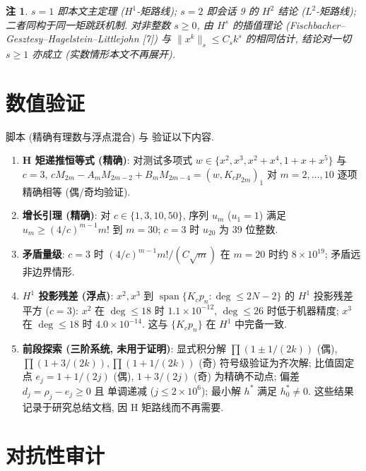 \documentclass[UTF8]{ctexart}
\newtheorem{remark}[theorem]{注}
\begin{document}
\begin{remark}
$s = 1$ 即本文主定理 ($H^1$-矩路线); $s = 2$ 即会话 9 的 $H^2$ 结论
($L^2$-矩路线); 二者同构于同一矩跳跃机制. 对非整数 $s \geq 0$, 由
$H^s$ 的插值理论 (Fischbacher--Gesztesy--Hagelstein--Littlejohn [7]) 与
$\|x^k\|_s \leq C_s k^s$ 的相同估计, 结论对一切 $s \geq 1$ 亦成立
(实数情形本文不再展开).
\end{remark}

\section{数值验证}

脚本  (精确有理数与浮点混合) 与
 验证以下内容.

\begin{enumerate}
	\item \textbf{H 矩递推恒等式 (精确)}: 对测试多项式 $w \in \{x^2, x^3,
		x^2+x^4, 1+x+x^5\}$ 与 $c = 3$,
		$c M_{2m} - A_m M_{2m-2} + B_m M_{2m-4} = (w, K_c p_{2m})_1$ 对
		$m = 2, \dots, 10$ 逐项精确相等 (偶/奇均验证).
	\item \textbf{增长引理 (精确)}: 对 $c \in \{1,3,10,50\}$, 序列
		$u_m$ ($u_1 = 1$) 满足 $u_m \geq (4/c)^{m-1} m!$ 到 $m = 30$;
		$c=3$ 时 $u_{20}$ 为 39 位整数.
	\item \textbf{矛盾量级}: $c=3$ 时 $(4/c)^{m-1}m! / (C\sqrt m)$ 在
		$m = 20$ 时约 $8\times10^{19}$; 矛盾远非边界情形.
	\item \textbf{$H^1$ 投影残差 (浮点)}: $x^2, x^3$ 到
		$\operatorname{span}\{K_c p_n : \deg \leq 2N-2\}$ 的 $H^1$ 投影残差平方
		($c=3$): $x^2$ 在 $\deg \leq 18$ 时 $1.1\times10^{-12}$, $\deg \leq 26$
		时低于机器精度; $x^3$ 在 $\deg \leq 18$ 时 $4.0\times10^{-14}$.
		这与 $\{K_c p_n\}$ 在 $H^1$ 中完备一致.
	\item \textbf{前段探索 (三阶系统, 未用于证明)}: 显式积分解
		$\prod(1 \pm 1/(2k))$ (偶), $\prod(1 + 3/(2k)), \prod(1+1/(2k))$ (奇)
		符号级验证为齐次解; 比值固定点 $e_j = 1+1/(2j)$ (偶),
		$1+3/(2j)$ (奇) 为精确不动点; 偏差 $d_j = \rho_j - e_j \geq 0$ 且
		单调递减 ($j \leq 2\times10^6$); 最小解 $h^*$ 满足 $h^*_0 \neq 0$.
		这些结果记录于研究总结文档, 因 H 矩路线而不再需要.
\end{enumerate}

\section{对抗性审计}
\end{document}
